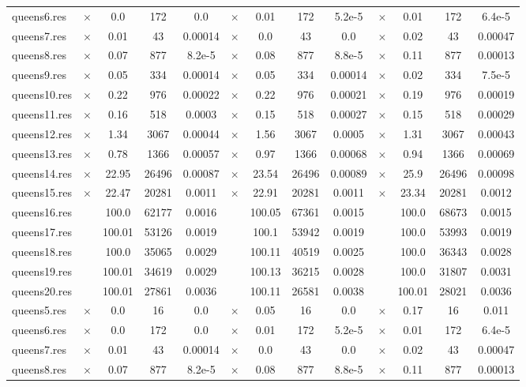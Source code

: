 \documentclass[main.tex]{subfiles}
\begin{document}
\begin{landscape}
\begin{center}
\begin{tabular}{|l|cccc|cccc|cccc|}
queens6.res & $\times$ & 0.0 & 172 & 0.0
 & $\times$ & 0.01 & 172 & 5.2e-5
 & $\times$ & 0.01 & 172 & 6.4e-5
\\
queens7.res & $\times$ & 0.01 & 43 & 0.00014
 & $\times$ & 0.0 & 43 & 0.0
 & $\times$ & 0.02 & 43 & 0.00047
\\
queens8.res & $\times$ & 0.07 & 877 & 8.2e-5
 & $\times$ & 0.08 & 877 & 8.8e-5
 & $\times$ & 0.11 & 877 & 0.00013
\\
queens9.res & $\times$ & 0.05 & 334 & 0.00014
 & $\times$ & 0.05 & 334 & 0.00014
 & $\times$ & 0.02 & 334 & 7.5e-5
\\
queens10.res & $\times$ & 0.22 & 976 & 0.00022
 & $\times$ & 0.22 & 976 & 0.00021
 & $\times$ & 0.19 & 976 & 0.00019
\\
queens11.res & $\times$ & 0.16 & 518 & 0.0003
 & $\times$ & 0.15 & 518 & 0.00027
 & $\times$ & 0.15 & 518 & 0.00029
\\
queens12.res & $\times$ & 1.34 & 3067 & 0.00044
 & $\times$ & 1.56 & 3067 & 0.0005
 & $\times$ & 1.31 & 3067 & 0.00043
\\
queens13.res & $\times$ & 0.78 & 1366 & 0.00057
 & $\times$ & 0.97 & 1366 & 0.00068
 & $\times$ & 0.94 & 1366 & 0.00069
\\
queens14.res & $\times$ & 22.95 & 26496 & 0.00087
 & $\times$ & 23.54 & 26496 & 0.00089
 & $\times$ & 25.9 & 26496 & 0.00098
\\
queens15.res & $\times$ & 22.47 & 20281 & 0.0011
 & $\times$ & 22.91 & 20281 & 0.0011
 & $\times$ & 23.34 & 20281 & 0.0012
\\
queens16.res &  & 100.0 & 62177 & 0.0016
 &  & 100.05 & 67361 & 0.0015
 &  & 100.0 & 68673 & 0.0015
\\
queens17.res &  & 100.01 & 53126 & 0.0019
 &  & 100.1 & 53942 & 0.0019
 &  & 100.0 & 53993 & 0.0019
\\
queens18.res &  & 100.0 & 35065 & 0.0029
 &  & 100.11 & 40519 & 0.0025
 &  & 100.0 & 36343 & 0.0028
\\
queens19.res &  & 100.01 & 34619 & 0.0029
 &  & 100.13 & 36215 & 0.0028
 &  & 100.0 & 31807 & 0.0031
\\
queens20.res &  & 100.01 & 27861 & 0.0036
 &  & 100.11 & 26581 & 0.0038
 &  & 100.01 & 28021 & 0.0036
\\
queens5.res & $\times$ & 0.0 & 16 & 0.0
 & $\times$ & 0.05 & 16 & 0.0
 & $\times$ & 0.17 & 16 & 0.011
\\
queens6.res & $\times$ & 0.0 & 172 & 0.0
 & $\times$ & 0.01 & 172 & 5.2e-5
 & $\times$ & 0.01 & 172 & 6.4e-5
\\
queens7.res & $\times$ & 0.01 & 43 & 0.00014
 & $\times$ & 0.0 & 43 & 0.0
 & $\times$ & 0.02 & 43 & 0.00047
\\
queens8.res & $\times$ & 0.07 & 877 & 8.2e-5
 & $\times$ & 0.08 & 877 & 8.8e-5
 & $\times$ & 0.11 & 877 & 0.00013
\\
\hline\end{tabular}
\end{center}
\end{landscape}
\end{document}
